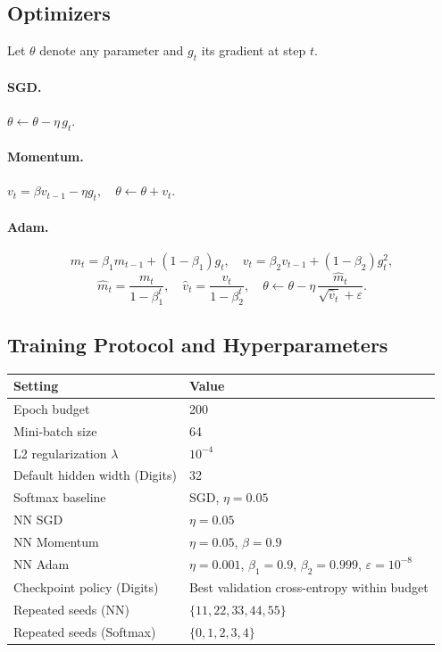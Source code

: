 \documentclass[11pt]{article}
\begin{document}
\subsection{Optimizers}

Let $\theta$ denote any parameter and $g_t$ its gradient at step $t$.

\paragraph{SGD.}
$\theta\leftarrow\theta-\eta\,g_t.$

\paragraph{Momentum.}
$v_t=\beta v_{t-1}-\eta g_t,\quad\theta\leftarrow\theta+v_t.$

\paragraph{Adam.}
\[
  m_t=\beta_1 m_{t-1}+(1-\beta_1)g_t,\quad
  v_t=\beta_2 v_{t-1}+(1-\beta_2)g_t^2,
\]
\[
  \hat{m}_t=\frac{m_t}{1-\beta_1^t},\quad
  \hat{v}_t=\frac{v_t}{1-\beta_2^t},\quad
  \theta\leftarrow\theta
    -\eta\,\frac{\hat{m}_t}{\sqrt{\hat{v}_t}+\varepsilon}.
\]

\subsection{Training Protocol and Hyperparameters}

\begin{center}
\renewcommand{\arraystretch}{1.3}
\begin{tabular}{ll}
\toprule
Setting & Value \\
\midrule
Epoch budget & 200 \\
Mini-batch size & 64 \\
L2 regularization $\lambda$ & $10^{-4}$ \\
Default hidden width (Digits) & 32 \\
Softmax baseline & SGD, $\eta=0.05$ \\
NN SGD & $\eta=0.05$ \\
NN Momentum & $\eta=0.05$, $\beta=0.9$ \\
NN Adam & $\eta=0.001$, $\beta_1=0.9$, $\beta_2=0.999$, $\varepsilon=10^{-8}$ \\
Checkpoint policy (Digits) & Best validation cross-entropy within budget \\
Repeated seeds (NN) & $\{11,22,33,44,55\}$ \\
Repeated seeds (Softmax) & $\{0,1,2,3,4\}$ \\
\bottomrule
\end{tabular}
\end{center}
\end{document}
